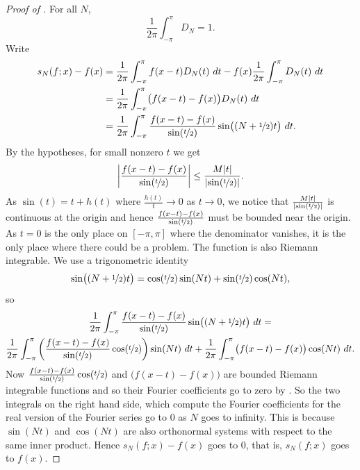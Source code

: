 \begin{proof}[Proof of ]
For all $N$,
\begin{equation*}
\frac{1}{2\pi} \int_{-\pi}^\pi D_N = 1 .
\end{equation*}
Write
\begin{equation*}
\begin{split}
s_N(f;x)-f(x) & =
\frac{1}{2\pi} \int_{-\pi}^\pi f(x-t) D_N(t) ~ dt 
-
f(x)
\frac{1}{2\pi} \int_{-\pi}^\pi D_N(t) ~ dt
\\
& = 
\frac{1}{2\pi} \int_{-\pi}^\pi \bigl( f(x-t) - f(x) \bigr) D_N(t) ~ dt 
\\
& = 
\frac{1}{2\pi} \int_{-\pi}^\pi \frac{f(x-t) - f(x)}{\sin(\nicefrac{t}{2})} \sin\bigl(
(N+\nicefrac{1}{2})t \bigr) ~ dt .
\end{split}
\end{equation*}
By the hypotheses,
for small nonzero $t$ we get
\begin{equation*}
\left\lvert { \frac{f(x-t) - f(x)}{\sin(\nicefrac{t}{2})} } \right\rvert
\leq
\frac{M\lvert {t} \rvert}{\lvert {\sin(\nicefrac{t}{2})} \rvert} .
\end{equation*}
As $\sin(t) = t + h(t)$ where $\frac{h(t)}{t} \to 0$ as $t \to 0$,
we notice that
$\frac{M\lvert {t} \rvert}{\lvert {\sin(\nicefrac{t}{2})} \rvert}$ is continuous at the origin
and hence 
$\frac{f(x-t) - f(x)}{\sin(\nicefrac{t}{2})}$ must be bounded near the origin.
As $t=0$ is the only place on $[-\pi,\pi]$ where the denominator vanishes,
it is the only place where there could be a problem.  The function is
also Riemann integrable.  We use a trigonometric identity
\begin{equation*}
\sin\bigl( (N+\nicefrac{1}{2})t \bigr)
=
\cos(\nicefrac{t}{2}) \sin(Nt) + 
\sin(\nicefrac{t}{2}) \cos(Nt) ,
\end{equation*}
so
\begin{multline*}
\frac{1}{2\pi} \int_{-\pi}^\pi \frac{f(x-t) - f(x)}{\sin(\nicefrac{t}{2})} \sin\bigl(
(N+\nicefrac{1}{2})t \bigr) ~ dt 
= \\
\frac{1}{2\pi} \int_{-\pi}^\pi
\left( \frac{f(x-t) - f(x)}{\sin(\nicefrac{t}{2})}
\cos (\nicefrac{t}{2}) \right) \sin (Nt) ~ dt
+
\frac{1}{2\pi} \int_{-\pi}^\pi \bigl( f(x-t) - f(x) \bigr)
\cos (Nt) ~ dt .
\end{multline*}
Now 
$\frac{f(x-t) - f(x)}{\sin(\nicefrac{t}{2})} \cos (\nicefrac{t}{2})$
and
$\bigl( f(x-t) - f(x) \bigr)$ are bounded Riemann integrable functions
and so their Fourier coefficients go to zero by .  So the two
integrals on the right hand side, which compute the Fourier coefficients
for the real version of the Fourier series go to 0 as $N$ goes to infinity.
This is because $\sin(Nt)$ and $\cos(Nt)$ are also orthonormal systems
with respect to the same inner product.
Hence $s_N(f;x)-f(x)$ goes to 0, that is, $s_N(f;x)$ goes to $f(x)$.
\end{proof}

